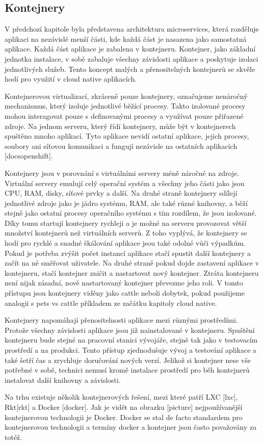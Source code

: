 \subsection{Kontejnery}
V předchozí kapitole byla představena architektura microservices, která rozděluje aplikaci na nezávislé menší části, kde každá část je nasazena jako samostatná aplikace. Každá část aplikace je zabalena v kontejneru. Kontejner, jako základní jednotka instalace, v sobě zabaluje všechny závislosti aplikace a poskytuje izolaci jednotlivých služeb. Tento koncept malých a přenositelných kontejnerů se skvěle hodí pro využití v cloud native aplikacích. \par
Kontejnerovou virtualizací, zkráceně pouze kontejnery, označujeme nenáročný mechanismus, který izoluje jednotlivé běžící procesy. Takto izolované procesy mohou interagovat pouze s definovanými procesy a využívat pouze přiřazené zdroje. Na jednom serveru, který řídí kontejnery, může být v kontejnerech spuštěno mnoho aplikací. Tyto aplikace nevidí ostatní aplikace, jejich procesy, soubory ani síťovou komunikaci a fungují nezávisle na ostatních aplikacích [docsopenshift]. \par
Kontejnery jsou v porovnání s virtuálními servery méně náročné na zdroje. Virtuální servery emulují celý operační systém a všechny jeho části jako jsou CPU, RAM, disky, síťové prvky a další. Na druhé straně kontejnery sdílejí jednotlivé zdroje jako je jádro systému, RAM, ale také různé knihovny, a běží stejně jako ostatní procesy operačního systému s tím rozdílem, že jsou izolované. Díky tomu startují kontejnery rychleji a je možné na serveru provozovat větší množství kontejnerů než virtuálních serverů. Z toho vyplývá, že kontejnery se hodí pro rychlé a snadné škálování aplikace jsou také odolné vůči výpadkům. Pokud je potřeba zvýšit počet instancí aplikace stačí spustit další kontejnery a začít na ně směřovat uživatele. Na druhé straně pokud dojde zastavení aplikace v kontejneru, stačí kontejner zničit a nastartovat nový kontejner. Ztráta kontejneru není nijak zásadní, nově nastartovaný kontejner převezme jeho roli. V tomto přístupu jsou kontejnery viděny jako cattle neboli dobytek, pokud použijeme analogii s pets vs cattle příkladem ze začátku kapitoly cloud native. \par
Kontejnery napomáhají přenositelnosti aplikace mezi různými prostředími. Protože všechny závislosti aplikace jsou již nainstalované v kontejneru. Spuštění kontejneru bude stejné na pracovní stanici vývojáře, stejně tak jako v testovacím prostředí a na produkci. Tento přístup zjednodušuje vývoj a testování aplikace a také šetří čas a zrychluje doručování nových verzí. Jelikož si kontejner nese vše potřebné v sobě, technici nemusí kromě instalace prostředí pro běh kontejnerů instalovat další knihovny a závislosti. \par
Na trhu existuje několik kontejnerových řešení, mezi které patří LXC [lxc],  Rkt[rkt] a Docker [docker]. Jak je vidět na obrazku [picture] nejpoužívanější kontejnerovou technologii je Docker. Docker se stal de facto standardem pro kontejnerovou technologii a termíny docker a kontejner jsou často považovány za totéž. 

